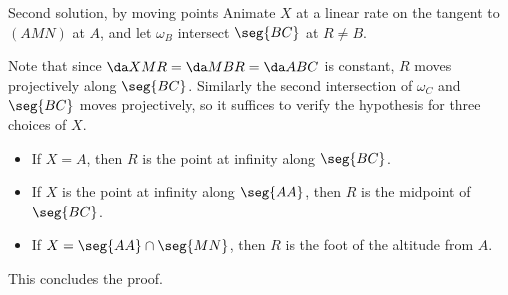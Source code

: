 \begin{customenv}{Second solution, by moving points}
    Animate $X$ at a linear rate on the tangent to $(AMN)$ at $A$, and let $\omega_B$ intersect $\seg{BC}$ at $R\ne B$.

    Note that since $\da XMR=\da MBR=\da ABC$ is constant, $R$ moves projectively along $\seg{BC}$. Similarly the second intersection of $\omega_C$ and $\seg{BC}$ moves projectively, so it suffices to verify the hypothesis for three choices of $X$.
    \begin{itemize}[itemsep=0em]
        \item If $X=A$, then $R$ is the point at infinity along $\seg{BC}$.
        \item If $X$ is the point at infinity along $\seg{AA}$, then $R$ is the midpoint of $\seg{BC}$.
        \item If $X=\seg{AA}\cap\seg{MN}$, then $R$ is the foot of the altitude from $A$.
    \end{itemize}
    This concludes the proof.
\end{customenv}

